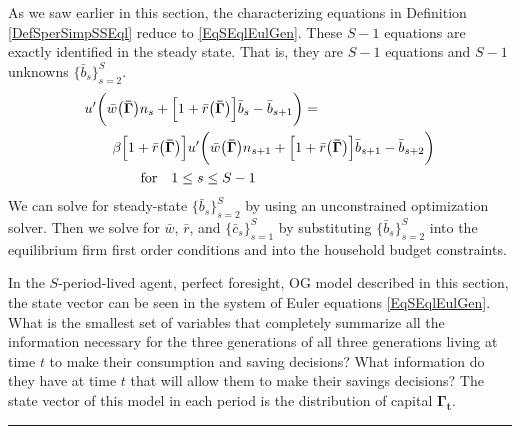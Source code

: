 \documentclass[letterpaper,12pt]{article}
\theoremstyle{definition}
\numberwithin{equation}{section}
\numberwithin{exercise}{section}
\begin{document}
      \begin{spacing}{1.5}

      As we saw earlier in this section, the characterizing equations in Definition \ref{DefSperSimpSSEql} reduce to \eqref{EqSEqlEulGen}. These $S-1$ equations are exactly identified in the steady state. That is, they are $S-1$ equations and $S-1$ unknowns $\{\bar{b}_s\}_{s=2}^S$.
      \begin{equation}\label{EqSEqlEulSS}
         \begin{split}
            &u'\biggl(\bar{w}\bigl(\bm{\bar{\Gamma}}\bigr)n_s + \Bigl[1 + \bar{r}\bigl(\bm{\bar{\Gamma}}\bigr)\Bigr]\bar{b}_s - \bar{b}_{s+1}\biggr) =  \\
            &\qquad \beta\Bigl[1+\bar{r}\bigl(\bm{\bar{\Gamma}}\bigr)\Bigr]u'\biggl(\bar{w}\bigl(\bm{\bar{\Gamma}}\bigr)n_{s+1} + \Bigl[1 + \bar{r}\bigl(\bm{\bar{\Gamma}}\bigr)\Bigr]\bar{b}_{s+1} - \bar{b}_{s+2}\biggr) \\
            &\qquad\qquad\text{for}\quad 1\leq s\leq S-1
         \end{split}
      \end{equation}
      We can solve for steady-state $\{\bar{b}_s\}_{s=2}^S$ by using an unconstrained optimization solver. Then we solve for $\bar{w}$, $\bar{r}$, and $\{\bar{c}_s\}_{s=1}^S$ by substituting $\{\bar{b}_s\}_{s=2}^S$ into the equilibrium firm first order conditions and into the household budget constraints.

      In the $S$-period-lived agent, perfect foresight, OG model described in this section, the state vector can be seen in the system of Euler equations \eqref{EqSEqlEulGen}. What is the smallest set of variables that completely summarize all the information necessary for the three generations of all three generations living at time $t$ to make their consumption and saving decisions? What information do they have at time $t$ that will allow them to make their savings decisions? The state vector of this model in each period is the distribution of capital $\bm{\Gamma_t}$.

      \end{spacing}
      \vspace{5mm}
      \hrule
      \vspace{-1mm}
\end{document}
